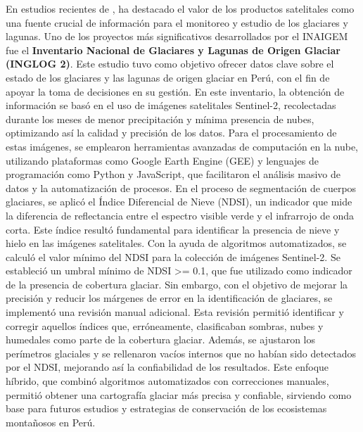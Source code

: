 En estudios recientes de \parencite{inaigem2023}, ha destacado el valor de los productos satelitales como una fuente crucial de información para el monitoreo y estudio de los glaciares y lagunas. Uno de los proyectos más significativos desarrollados por el INAIGEM fue el \textbf{Inventario Nacional de Glaciares y Lagunas de Origen Glaciar (INGLOG 2)}. Este estudio tuvo como objetivo ofrecer datos clave sobre el estado de los glaciares y las lagunas de origen glaciar en Perú, con el fin de apoyar la toma de decisiones en su gestión. En este inventario, la obtención de información se basó en el uso de imágenes satelitales Sentinel-2, recolectadas durante los meses de menor precipitación y mínima presencia de nubes, optimizando así la calidad y precisión de los datos. Para el procesamiento de estas imágenes, se emplearon herramientas avanzadas de computación en la nube, utilizando plataformas como Google Earth Engine (GEE) y lenguajes de programación como Python y JavaScript, que facilitaron el análisis masivo de datos y la automatización de procesos. En el proceso de segmentación de cuerpos glaciares, se aplicó el Índice Diferencial de Nieve (NDSI), un indicador que mide la diferencia de reflectancia entre el espectro visible verde y el infrarrojo de onda corta. Este índice resultó fundamental para identificar la presencia de nieve y hielo en las imágenes satelitales. Con la ayuda de algoritmos automatizados, se calculó el valor mínimo del NDSI para la colección de imágenes Sentinel-2. Se estableció un umbral mínimo de NDSI >= 0.1, que fue utilizado como indicador de la presencia de cobertura glaciar. Sin embargo, con el objetivo de mejorar la precisión y reducir los márgenes de error en la identificación de glaciares, se implementó una revisión manual adicional. Esta revisión permitió identificar y corregir aquellos índices que, erróneamente, clasificaban sombras, nubes y humedales como parte de la cobertura glaciar. Además, se ajustaron los perímetros glaciales y se rellenaron vacíos internos que no habían sido detectados por el NDSI, mejorando así la confiabilidad de los resultados. Este enfoque híbrido, que combinó algoritmos automatizados con correcciones manuales, permitió obtener una cartografía glaciar más precisa y confiable, sirviendo como base para futuros estudios y estrategias de conservación de los ecosistemas montañosos en Perú.


